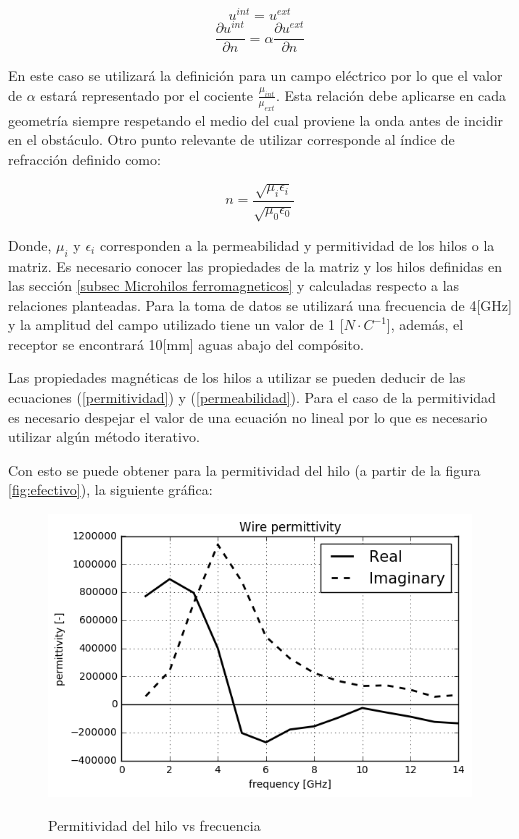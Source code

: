 \documentclass[12pt,letterpaper]{article}
\numberwithin{equation}{section}
\begin{document}
$$u^{int} = u^{ext}$$
$$\frac{\partial u^{int}}{\partial n} =\alpha \frac{\partial u^{ext}}{\partial n}$$
	
En este caso se utilizará la definición para un campo eléctrico por lo que el valor de $\alpha$ estará representado por el cociente $\frac{\mu_{int}}{\mu_{ext}}$. Esta relación debe aplicarse en cada geometría siempre respetando el medio del cual proviene la onda antes de incidir en el obstáculo. Otro punto relevante de utilizar corresponde al índice de refracción definido como:

$$n = \frac{\sqrt{\mu_i\epsilon_i}}{\sqrt{\mu_0\epsilon_0}}$$

Donde, $\mu_i$ y $\epsilon_i$ corresponden a la permeabilidad y permitividad de los hilos o la matriz. Es necesario conocer las propiedades de la matriz y los hilos definidas en las sección \ref{subsec Microhilos ferromagneticos} y calculadas respecto a las relaciones planteadas. Para la toma de datos se utilizará una frecuencia de 4[GHz] y la amplitud del campo utilizado tiene un valor de 1 [$N\cdot C^{-1}$], además, el receptor se encontrará 10[mm] aguas abajo del compósito.

Las propiedades magnéticas de los hilos a utilizar se pueden deducir de las ecuaciones (\ref{permitividad}) y (\ref{permeabilidad}). Para el caso de la permitividad es necesario despejar el valor de una ecuación no lineal por lo que es necesario utilizar algún método iterativo.

Con esto se puede obtener para la permitividad del hilo (a partir de la figura \ref{fig:efectivo}), la siguiente gráfica:

\begin{figure}[H]
	\centering\includegraphics[scale=0.8]{Imagenes/wire_permittivity.png}\\
	\caption{Permitividad del hilo vs frecuencia}
	\label{fig:wire_permittivity}
\end{figure} 
\end{document}
